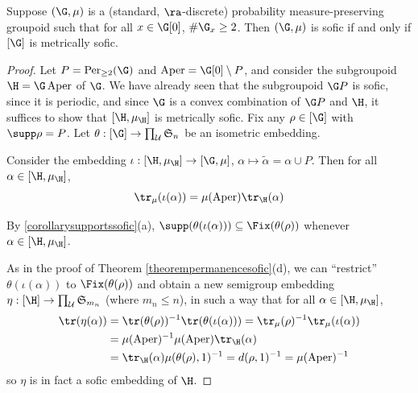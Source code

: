 \begin{theorem}\label{theoremsecondimportant}
Suppose $(\G,\mu)$ is a (standard, $\ra$-discrete) probability measure-preserving groupoid such that for all $x\in\G[0]$, $\#\G_x\geq 2$. Then $(\G,\mu)$ is sofic if and only if $[\G]$ is metrically sofic.
\end{theorem}
\begin{proof}
Let $P=\operatorname{Per}_{\geq 2}(\G)$ and $\operatorname{Aper}=\G[0]\setminus P$, and consider the subgroupoid $\H=\G\operatorname{Aper}$ of $\G$. We have already seen that the subgroupoid $\G P$ is sofic, since it is periodic, and since $\G$ is a convex combination of $\G P$ and $\H$, it suffices to show that $[\H,\mu_{\H}]$ is metrically sofic. Fix any $\rho\in[\G]$ with $\supp\rho=P$. Let $\theta:[\G]\to\prod_{\mathcal{U}}\mathfrak{S}_n$ be an isometric embedding.

Consider the embedding $\iota:[\H,\mu_{\H}]\to[\G,\mu]$, $\alpha\mapsto \widetilde{\alpha}=\alpha\cup P$. Then for all $\alpha\in[\H,\mu_{\H}]$,
\[\tr_\mu(\iota(\alpha))=\mu(\operatorname{Aper})\tr_{\H}(\alpha)\]

By \ref{corollarysupportssofic}(a), $\supp(\theta(\iota(\alpha)))\subseteq\Fix(\theta(\rho))$ whenever $\alpha\in[\H,\mu_{\H}]$.

As in the proof of Theorem \ref{theorempermanencesofic}(d), we can ``restrict'' $\theta(\iota(\alpha))$ to $\Fix(\theta(\rho))$ and obtain a new semigroup embedding $\eta:[\H]\to\prod_{\mathcal{U}}\mathfrak{S}_{m_n}$ (where $m_n\leq n$), in such a way that for all $\alpha\in[\H,\mu_{\H}]$,
\begin{align*}
\tr(\eta(\alpha))&=\tr(\theta(\rho))^{-1}\tr(\theta(\iota(\alpha)))=\tr_\mu(\rho)^{-1}\tr_\mu(\iota(\alpha))\\
&=\mu(\operatorname{Aper})^{-1}\mu(\operatorname{Aper})\tr_{\H}(\alpha)\\
&=\tr_{\H}(\alpha)\mu(\theta(\rho),1)^{-1}=d(\rho,1)^{-1}=\mu(\operatorname{Aper})^{-1}
\end{align*}
so $\eta$ is in fact a sofic embedding of $\H$.\qedhere
\end{proof}